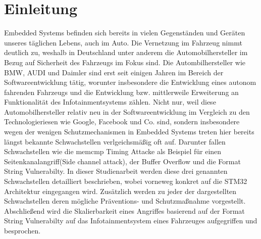 \documentclass[a4paper,
DIV=13,
12pt,
BCOR=10mm,
department=FakIM,
oneside,
parskip=half,
automark,
listof=totocnumbered,
bibliography=totocnumbered,
acronym=totocnumbered
] {OTHRartcl}
\begin{document}
\section{Einleitung}
Embedded Systems befinden sich bereits in vielen Gegenständen und Geräten unseres täglichen Lebens, auch im Auto.
Die Vernetzung im Fahrzeug nimmt deutlich zu, weshalb in Deutschland unter anderem die Automobilhersteller im Bezug auf Sicherheit des Fahrzeugs im Fokus sind.
Die Autombilhersteller wie BMW, AUDI und Daimler sind erst seit einigen Jahren im Bereich der Softwareentwicklung tätig, worunter insbesondere die Entwicklung eines autonom fahrenden Fahrzeugs und die Entwicklung
bzw. mittlerweile Erweiterung an Funktionalität des Infotainmentsystems zählen. Nicht nur, weil diese Automobilhersteller relativ neu in der Softwareentwicklung im Vergleich zu den Technologieriesen wie Google, Facebook und Co.
sind, sondern insbesondere wegen der wenigen Schutzmechanismen in Embedded Systems treten hier bereits längst bekannte Schwachstellen verlgeichsmäßig oft auf.
Darunter fallen Schwachstellen wie die memcmp Timing Attacke als Beispiel für einen Seitenkanalangriff(Side channel attack), der Buffer Overflow und die Format String Vulnerabilty.
In dieser Studienarbeit werden diese drei genannten Schwachstellen detailliert beschrieben, wobei vorneweg konkret auf die STM32 Architektur eingegangen wird.
Zusätzlich werden zu jeder der dargestellten Schwachstellen deren mögliche Präventions- und Schutzmaßnahme vorgestellt.
Abschließend wird die Skalierbarkeit eines Angriffes basierend auf der Format String Vulnerabilty auf das Infotainmentsystem eines Fahrzeuges aufgegriffen und besprochen.


\end{document}
